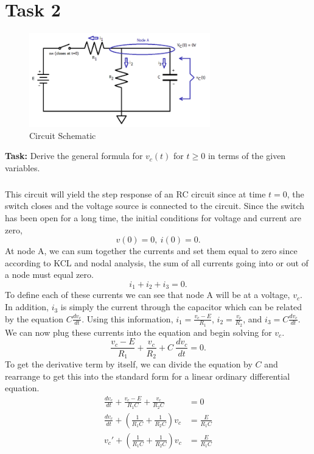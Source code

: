 \documentclass[12pt]{article}
\begin{document}
    \section*{Task 2}
    \begin{figure}[h]
        \centering
        \includegraphics[width=0.7\textwidth]{Task 2 Schematic.png}
        \caption{Circuit Schematic}
    \end{figure}
    \textbf{Task:} Derive the general formula for $v_{c}(t)$ for $t \ge 0$ in
    terms of the given variables.
    \subparagraph*{} This circuit will yield the step response of an RC circuit
    since at time $t = 0$, the switch closes and the voltage source is connected
    to the circuit. Since the switch has been open for a long time, the initial
    conditions for voltage and current are zero,
    \[
        v(0) = 0,\ i(0) = 0.
    \]
    At node A, we can sum together the currents and set them equal to zero since
    according to KCL and nodal analysis, the sum of all currents going into or
    out of a node must equal zero.
    \[
        i_1 + i_2 + i_3 = 0.
    \]
    To define each of these currents we can see that node A will be at a
    voltage, $v_{c}$. In addition, $i_3$ is simply the current through the
    capacitor which can be related by the equation $C\frac{dv_{c}}{dt}$. Using
    this information, $i_1 = \frac{v_{c} - E}{R_1}$, $i_2 =
    \frac{v_{c}}{R_{2}}$, and $i_3 = C \frac{dv_{c}}{dt}$. We can now plug these
    currents into the equation and begin solving for $v_{c}$.
    \[
        \frac{v_{c} - E}{R_1} + \frac{v_{c}}{R_{2}} + C\ \frac{dv_{c}}{dt} = 0.
    \]
    To get the derivative term by itself, we can divide the equation by $C$ and
    rearrange to get this into the standard form for a linear ordinary
    differential equation.
    \begin{align*}
        \frac{dv_{c}}{dt} + \frac{v_{c} - E}{R_1C} + \frac{v_{c}}{R_2C} &= 0 \\
        \frac{dv_{c}}{dt} + \left( \frac{1}{R_1C} + \frac{1}{R_2C} \right)v_{c} &= \frac{E}{R_1C} \\
        v_{c}' + \left( \frac{1}{R_1C} + \frac{1}{R_2C} \right)v_{c} &= \frac{E}{R_1C}
    \end{align*}
\end{document}
